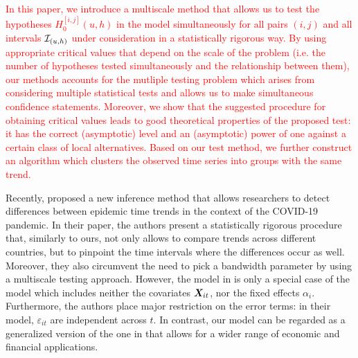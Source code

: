 \documentclass[a4paper,12pt]{article}
\makeatletter
\renewcommand{\eqref}[1]{\tagform@{\ref{#1}}}
\makeatother
\begin{document}
\textcolor{red}{In this paper, we introduce a multiscale method that allows us to test the hypotheses $H_0^{[i,j]}(u,h)$ in the model \eqref{eq:model} simultaneously for all pairs $(i, j)$ and all intervals $\mathcal{I}_{(u, h)}$ under consideration in a statistically rigorous way. By using appropriate critical values that depend on the scale of the problem (i.e. the number of hypotheses tested simultaneously and the relationship between them), our methods accounts for the mutliple testing problem which arises from considering multiple statistical tests and allows us to make simultaneous confidence statements. Moreover, we show that the suggested procedure for obtaining critical values leads to good theoretical properties of the proposed test: it has the correct (asymptotic) level and an (asymptotic) power of one against a certain class of local alternatives. Based on our test method, we further construct an algorithm which clusters the observed time series into groups with the same trend.}



Recently, \cite{KhismatullinaVogt2021} proposed a new inference method that allows researchers to detect differences between epidemic time trends in the context of the COVID-19 pandemic. In their paper, the authors present a statistically rigorous procedure that, similarly to ours, not only allows to compare trends across different countries, but to pinpoint the time intervals where the differences occur as well. Moreover, they also circumvent the need to pick a bandwidth parameter by using a multiscale testing approach. However, the model in \cite{KhismatullinaVogt2021} is only a special case of the model \eqref{eq:model} which includes neither the covariates $\boldsymbol{X}_{it}$, nor the fixed effects $\alpha_i$. Furthermore, the authors place major restriction on the error terms: in their model, $\varepsilon_{it}$ are independent across $t$. In contrast, our model \eqref{eq:model} can be regarded as a generalized version of the one in \cite{KhismatullinaVogt2021} that allows for a wider range of economic and financial applications.

\end{document}
